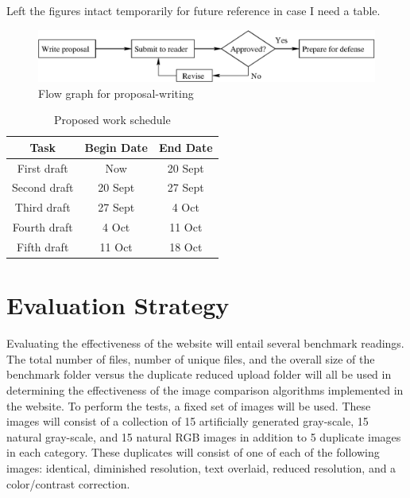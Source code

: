 \documentclass[11pt]{article}
\begin{document}
Left the figures intact temporarily for future reference in case I need a table.
\begin{figure}[htbp]
\centering
\includegraphics[width=5in]{flow}
\caption{Flow graph for proposal-writing}
\label{intro-fig1}
\end{figure}

\begin{table}[htbp]
\centering
\begin{tabular}{|c||c|c|}
\hline
\bf Task & \bf Begin Date & \bf End Date\\\hline\hline
First draft & Now & 20 Sept\\\hline
Second draft & 20 Sept & 27 Sept\\\hline
Third draft & 27 Sept & 4 Oct\\\hline
Fourth draft & 4 Oct & 11 Oct\\\hline
Fifth draft & 11 Oct & 18 Oct\\\hline
\end{tabular}
\caption{Proposed work schedule}
\label{intro-tab1}
\end{table}

\vspace*{-.2in}
\section{Evaluation Strategy}
\label{sec:evaluate}
\vspace*{-.1in}


Evaluating the effectiveness of the website will entail several benchmark readings. The total number of files, number of unique files, and the overall size of the benchmark folder versus the duplicate reduced upload folder will all be used in determining the effectiveness of the image comparison algorithms implemented in the website. To perform the tests, a fixed set of images will be used. These images will consist of a collection of 15 artificially generated gray-scale, 15 natural gray-scale, and 15 natural RGB images in addition to 5 duplicate images in each category. These duplicates will consist of one of each of the following images: identical, diminished resolution, text overlaid, reduced resolution, and a color/contrast correction.
\end{document}
